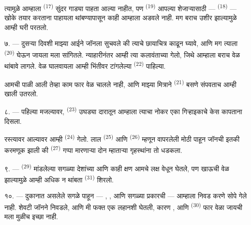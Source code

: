 त्यामुळे आम्हाला  \textsuperscript{(17)} सुंदर गाड्या पाहता आल्या
नाहीत, पण  \textsuperscript{(19)} आपल्या शेजाऱ्यासाठी —
 \textsuperscript{(18)} — खोके तयार करताना पाहायला
थांबण्यापासून काही आम्हाला अडवले नाही. मग बराच उशीर झाल्यामुळे आम्ही घरी परतलो.

\VUsaut{3.0mm}

७. --- दुसऱ्या दिवशी माझ्या आईने जॉनला सुचवले की त्याचे छायाचित्र काढून घ्यावे, आणि मग त्याला
 \textsuperscript{(20)} घेऊन जायला मला सांगितले. न्याहारीनंतर आम्ही
त्या कलावंताच्या  गेलो, जिथे आम्हाला बराच वेळ थांबावे लागले. वेळ घालवायला
आम्ही भिंतीवर टांगलेल्या  \textsuperscript{(22)} पाहिल्या.

आमची पाळी आली तेव्हा काम फार वेळ चालले नाही, आणि माझ्या मित्राने 
\textsuperscript{(21)} बसणे संपवताच आम्ही खाली उतरलो.

८. --- पहिल्या मजल्यावर,  \textsuperscript{(23)} उघड्या दारातून आम्हाला
त्याचा नोकर एका गिऱ्हाइकाचे केस कापताना दिसला.

रस्त्यावर आल्यावर आम्ही  \textsuperscript{(24)} गेलो. लाल
 \textsuperscript{(25)} आणि  \textsuperscript{(26)} म्हणून वापरलेली
मोठी  पाहून जॉनची इतकी करमणूक झाली की  \textsuperscript{(27)}
गप्पा मारणाऱ्या दोन म्हाताऱ्या गृहस्थांना तो धडकला.

\VUsaut{3.0mm}

९. ---  \textsuperscript{(29)}  मांडलेल्या सगळ्या
देशांच्या  आणि  काही क्षण आमचे लक्ष वेधून घेतले, पण खाऊची
वेळ झाल्यामुळे आम्ही अधिक न थांबता  \textsuperscript{(31)} शिरलो.

१०. --- दुकानात असलेले सगळे  पाहून — , ,
 आणि सगळ्या प्रकारची  — आम्हाला निवड करणे सोपे गेले नाही. शेवटी
जॉनने  निवडले, आणि मी फक्त एक लहानशी  घेतली, कारण
, आणि  \textsuperscript{(30)} फार
वेळा जायची मला मुळीच इच्छा नाही.

\VUsaut{3.0mm}

